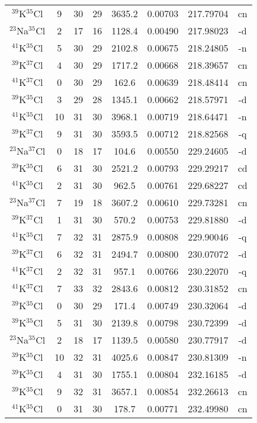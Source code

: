 \begin{table*}[htp]
\begin{tabular}{cccccccc}
$^{39}$K$^{35}$Cl & 9 & 30 & 29 & 3635.2 & 0.00703 & 217.79704 & cn \\
$^{23}$Na$^{35}$Cl & 2 & 17 & 16 & 1128.4 & 0.00490 & 217.98023 & -d \\
$^{41}$K$^{35}$Cl & 5 & 30 & 29 & 2102.8 & 0.00675 & 218.24805 & -n \\
$^{39}$K$^{37}$Cl & 4 & 30 & 29 & 1717.2 & 0.00668 & 218.39657 & cn \\
$^{41}$K$^{37}$Cl & 0 & 30 & 29 & 162.6 & 0.00639 & 218.48414 & cn \\
$^{39}$K$^{35}$Cl & 3 & 29 & 28 & 1345.1 & 0.00662 & 218.57971 & -d \\
$^{41}$K$^{35}$Cl & 10 & 31 & 30 & 3968.1 & 0.00719 & 218.64471 & -n \\
$^{39}$K$^{37}$Cl & 9 & 31 & 30 & 3593.5 & 0.00712 & 218.82568 & -q \\
$^{23}$Na$^{37}$Cl & 0 & 18 & 17 & 104.6 & 0.00550 & 229.24605 & -d \\
$^{39}$K$^{35}$Cl & 6 & 31 & 30 & 2521.2 & 0.00793 & 229.29217 & cd \\
$^{41}$K$^{35}$Cl & 2 & 31 & 30 & 962.5 & 0.00761 & 229.68227 & cd \\
$^{23}$Na$^{37}$Cl & 7 & 19 & 18 & 3607.2 & 0.00610 & 229.73281 & cn \\
$^{39}$K$^{37}$Cl & 1 & 31 & 30 & 570.2 & 0.00753 & 229.81880 & -d \\
$^{41}$K$^{35}$Cl & 7 & 32 & 31 & 2875.9 & 0.00808 & 229.90046 & -q \\
$^{39}$K$^{37}$Cl & 6 & 32 & 31 & 2494.7 & 0.00800 & 230.07072 & -d \\
$^{41}$K$^{37}$Cl & 2 & 32 & 31 & 957.1 & 0.00766 & 230.22070 & -q \\
$^{41}$K$^{37}$Cl & 7 & 33 & 32 & 2843.6 & 0.00812 & 230.31852 & cn \\
$^{39}$K$^{35}$Cl & 0 & 30 & 29 & 171.4 & 0.00749 & 230.32064 & -d \\
$^{39}$K$^{35}$Cl & 5 & 31 & 30 & 2139.8 & 0.00798 & 230.72399 & -d \\
$^{23}$Na$^{35}$Cl & 2 & 18 & 17 & 1139.5 & 0.00580 & 230.77917 & -d \\
$^{39}$K$^{35}$Cl & 10 & 32 & 31 & 4025.6 & 0.00847 & 230.81309 & -n \\
$^{39}$K$^{35}$Cl & 4 & 31 & 30 & 1755.1 & 0.00804 & 232.16185 & -d \\
$^{39}$K$^{35}$Cl & 9 & 32 & 31 & 3657.1 & 0.00854 & 232.26613 & cn \\
$^{41}$K$^{35}$Cl & 0 & 31 & 30 & 178.7 & 0.00771 & 232.49980 & cn \\

\end{tabular}
\end{table*}
